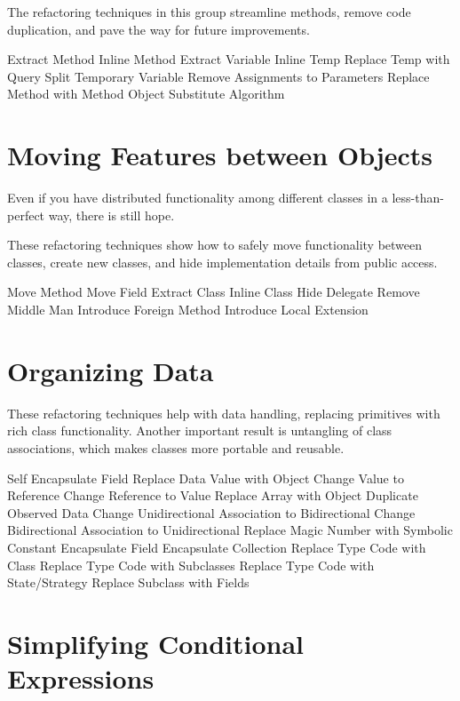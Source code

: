 \documentclass[11pt,a4paper,oneside]{book}
\begin{document}
The refactoring techniques in this group streamline methods, remove code duplication, and pave the way for future improvements.

    Extract Method
    Inline Method
    Extract Variable
    Inline Temp
    Replace Temp with Query
    Split Temporary Variable
    Remove Assignments to Parameters
    Replace Method with Method Object
    Substitute Algorithm


\section{Moving Features between Objects}

Even if you have distributed functionality among different classes in a less-than-perfect way, there is still hope.

These refactoring techniques show how to safely move functionality between classes, create new classes, and hide implementation details from public access.

    Move Method
    Move Field
    Extract Class
    Inline Class
    Hide Delegate
    Remove Middle Man
    Introduce Foreign Method
    Introduce Local Extension



\section{Organizing Data}

These refactoring techniques help with data handling, replacing primitives with rich class functionality. Another important result is untangling of class associations, which makes classes more portable and reusable.

    Self Encapsulate Field
    Replace Data Value with Object
    Change Value to Reference
    Change Reference to Value
    Replace Array with Object
    Duplicate Observed Data
    Change Unidirectional Association to Bidirectional
    Change Bidirectional Association to Unidirectional
    Replace Magic Number with Symbolic Constant
    Encapsulate Field
    Encapsulate Collection
    Replace Type Code with Class
    Replace Type Code with Subclasses
    Replace Type Code with State/Strategy
    Replace Subclass with Fields




\section{Simplifying Conditional Expressions}
\end{document}

